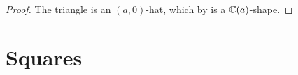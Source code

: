 \documentclass[%
    a4paper,              %
    style=screen,          %
    bibliography=totoc,   %
    nexus,                %
    lnum,                 %
    extramargin,          %
]{tubsbook}
\begin{document}
\begin{proof}
    The triangle is an $(a,0)$-hat, which by  is a $\mathbb{C}(a)$-shape.
\end{proof}

%
%
%
%
%
%
%
%

%
%

\section{Squares}
\end{document}
